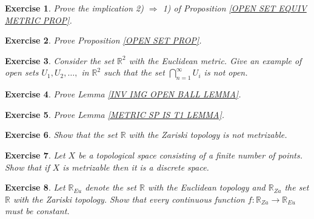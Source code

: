\documentclass[11pt, letterpaper, oneside]{report}
\theoremstyle{pplain}
\newtheorem{ITERMVALUE THM}[theorem]{Intermediate Value Theorem}
\newtheorem{HEINEBOREL THM}[theorem]{Heine-Borel Theorem}
\newtheorem{UMETR THM}[theorem]{Urysohn Metrization Theorem}
\newtheorem{UMETR2 THM}[theorem]{Urysohn Metrization Theorem (v.2)}
\theoremstyle{ddefinition}
\theoremstyle{nnn}
\newtheorem{TDA NN}[theorem]{Topological Data Analysis. }
\theoremstyle{eexercise}
\newtheorem{exercise}{Exercise}[chapter]
\newcommand{\Ra}{\Rightarrow}
\newcommand{\R}{{\mathbb R}}
\begin{document}
\begin{exercise} 
Prove the implication 2) $\Ra$ 1) of Proposition \ref{OPEN SET EQUIV METRIC PROP}.
\end{exercise}






\begin{exercise} 
Prove Proposition \ref{OPEN SET PROP}.
\end{exercise}





\begin{exercise} 
Consider the set $\R^{2}$ with the Euclidean metric. Give an example of open sets 
$U_{1}, U_{2}, \dots, $ in $\R^{2}$ such that the set $\bigcap_{n=1}^{\infty} U_{i}$ is not open.
\end{exercise}




\begin{exercise} 
Prove Lemma \ref{INV IMG OPEN BALL LEMMA}.
\end{exercise}




\begin{exercise} 
Prove Lemma \ref{METRIC SP IS T1 LEMMA}. 
\end{exercise}




\begin{exercise} 
\label{ZARISKI NOT METRIZABLE EXERCISE}
Show that the set $\R$ with the Zariski topology is not metrizable. 
\end{exercise}




\begin{exercise}
Let $X$ be a topological space consisting of a finite number of points. Show that if $X$ is metrizable then
it is a discrete space. 
\end{exercise}





\begin{exercise}
Let $\R_{Eu}$ denote the set $\R$ with the Euclidean topology and $\R_{Za}$ 
the set $\R$ with the Zariski topology. Show that every continuous function 
$f\colon \R_{Za} \to \R_{Eu}$  must be constant. 
\end{exercise}
\end{document}
